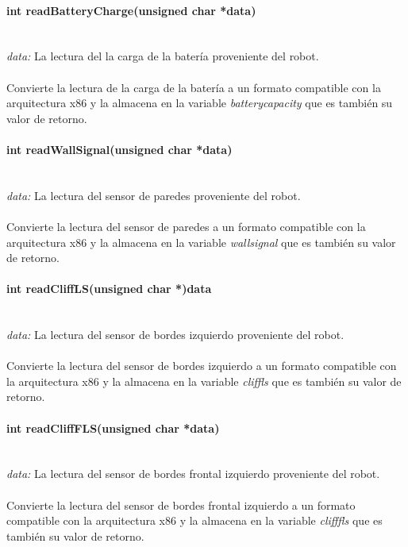 \documentclass[letterpaper,openright,12pt]{book}
\begin{document}
\paragraph{int readBatteryCharge(unsigned char *data)}\mbox{}\\
\emph{data: }La lectura del la carga de la batería proveniente del robot.\\\\
Convierte la lectura de la carga de la batería a un formato compatible con la arquitectura x86 y la almacena en la variable \emph{batterycapacity} que es también su valor de retorno.\\ 

\paragraph{int readWallSignal(unsigned char *data)}\mbox{}\\
\emph{data: }La lectura del sensor de paredes proveniente del robot.\\\\
Convierte la lectura del sensor de paredes a un formato compatible con la arquitectura x86 y la almacena en la variable \emph{wallsignal} que es también su valor de retorno.\\ 

\paragraph{int readCliffLS(unsigned char *)data}\mbox{}\\
\emph{data: }La lectura del sensor de bordes izquierdo proveniente del robot.\\\\
Convierte la lectura del sensor de bordes izquierdo a un formato compatible con la arquitectura x86 y la almacena en la variable \emph{cliffls} que es también su valor de retorno.\\ 

\paragraph{int readCliffFLS(unsigned char *data)}\mbox{}\\
\emph{data: }La lectura del sensor de bordes frontal izquierdo proveniente del robot.\\\\
Convierte la lectura del sensor de bordes frontal izquierdo a un formato compatible con la arquitectura x86 y la almacena en la variable \emph{clifffls} que es también su valor de retorno.\\ 
\end{document}
